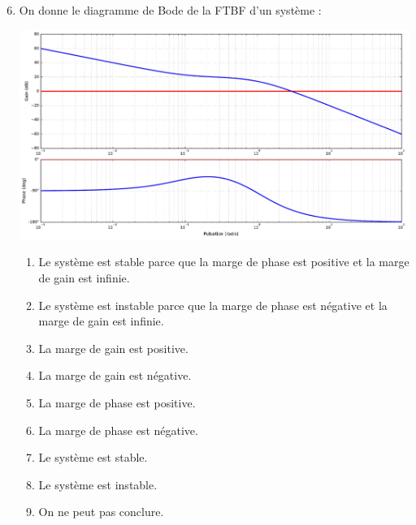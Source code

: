 \documentclass[10pt,fleqn]{article} %
\begin{document}
\begin{multicols}{2}
\begin{enumerate}
\setcounter{enumi}{5}
\item On donne le diagramme de Bode de la FTBF d'un système : 
\begin{center}
\includegraphics[width=\linewidth]{images/img_01}
\end{center}
\begin{enumerate}
\item Le système est stable parce que la marge de phase est positive et la marge de gain est infinie.
\item Le système est instable parce que la marge de phase est négative et la marge de gain est infinie.
\item La marge de gain est positive.
\item La marge de gain est négative.
\item La marge de phase est positive.
\item La marge de phase est négative.
\item Le système est stable.
\item Le système est instable.
\item On ne peut pas conclure. %
\end{enumerate}
\end{enumerate}


\end{multicols}
\end{document}
